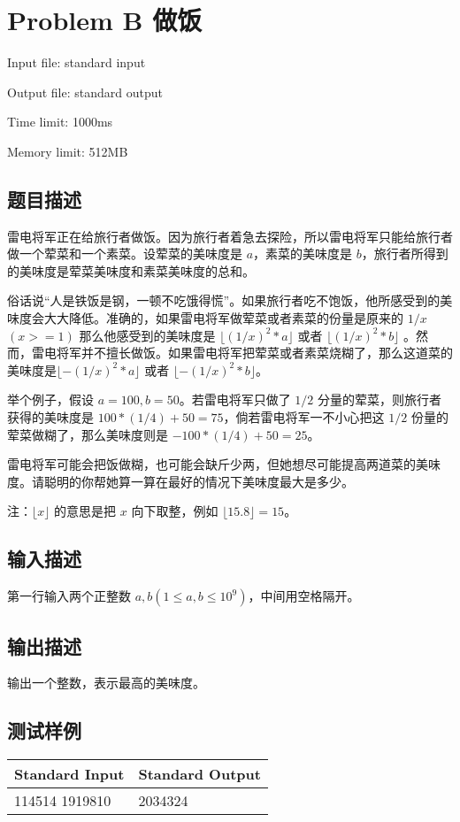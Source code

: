 \newpage
\section{Problem B 做饭}
{ \limitfont{}
Input file: standard input \par
Output file: standard output \par
Time limit: 1000ms \par
Memory limit: 512MB \par
}
\subsection*{题目描述}

雷电将军正在给旅行者做饭。因为旅行者着急去探险，所以雷电将军只能给旅行者做一个荤菜和一个素菜。设荤菜的美味度是 $a$，素菜的美味度是 $b$，旅行者所得到的美味度是荤菜美味度和素菜美味度的总和。

俗话说“人是铁饭是钢，一顿不吃饿得慌”。如果旅行者吃不饱饭，他所感受到的美味度会大大降低。准确的，如果雷电将军做荤菜或者素菜的份量是原来的 $1/x$ $(x >= 1)$ 那么他感受到的美味度是 $\lfloor(1/x)^2 *a\rfloor$ 或者 $\lfloor(1/x)^2 *b\rfloor$ 。然而，雷电将军并不擅长做饭。如果雷电将军把荤菜或者素菜烧糊了，那么这道菜的美味度是$\lfloor-(1/x)^2 *a\rfloor$ 或者 $\lfloor-(1/x)^2 *b\rfloor$。

举个例子，假设 $a=100,b=50$。若雷电将军只做了 $1/2$ 分量的荤菜，则旅行者获得的美味度是 $100*(1/4)+50=75$，倘若雷电将军一不小心把这 $1/2$ 份量的荤菜做糊了，那么美味度则是 $-100*(1/4)+50=25$。

雷电将军可能会把饭做糊，也可能会缺斤少两，但她想尽可能提高两道菜的美味度。请聪明的你帮她算一算在最好的情况下美味度最大是多少。

注：$\lfloor x \rfloor$ 的意思是把 $x$ 向下取整，例如 $\lfloor 15.8 \rfloor = 15$。

\subsection*{输入描述}

第一行输入两个正整数 $a,b(1 \leq a,b \leq 10^9)$，中间用空格隔开。

\subsection*{输出描述}

输出一个整数，表示最高的美味度。

\subsection*{测试样例}

\begin{table}[H]
\begin{tabularx}{\textwidth}{|X|X|}
    \hline
    \textbf{Standard Input} & \textbf{Standard Output} \\ 
    \hline
    114514 1919810 & 2034324 \\
    \hline
\end{tabularx}
\end{table}